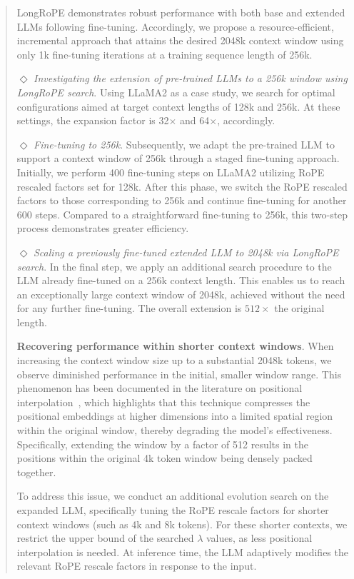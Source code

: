 \begin{abstract}
LongRoPE demonstrates robust performance with both base and extended LLMs following fine-tuning. Accordingly, we propose a resource-efficient, incremental approach that attains the desired 2048k context window using only 1k fine-tuning iterations at a training sequence length of 256k.

$\Diamond$ \textit{Investigating the extension of pre-trained LLMs to a 256k window using LongRoPE search}. Using LLaMA2 as a case study, we search for optimal configurations aimed at target context lengths of 128k and 256k. At these settings, the expansion factor is 32$\times$ and 64$\times$, accordingly.

$\Diamond$ \textit{Fine-tuning to 256k}. Subsequently, we adapt the pre-trained LLM to support a context window of 256k through a staged fine-tuning approach. Initially, we perform 400 fine-tuning steps on LLaMA2 utilizing RoPE rescaled factors set for 128k. After this phase, we switch the RoPE rescaled factors to those corresponding to 256k and continue fine-tuning for another 600 steps. Compared to a straightforward fine-tuning to 256k, this two-step process demonstrates greater efficiency.

$\Diamond$ \textit{Scaling a previously fine-tuned extended LLM to 2048k via LongRoPE search}. In the final step, we apply an additional search procedure to the LLM already fine-tuned on a 256k context length. This enables us to reach an exceptionally large context window of 2048k, achieved without the need for any further fine-tuning. The overall extension is $512\times$ the original length.

\textbf{Recovering performance within shorter context windows}.  When increasing the context window size up to a substantial 2048k tokens, we observe diminished performance in the initial, smaller window range. This phenomenon has been documented in the literature on positional interpolation~\cite{pi}, which highlights that this technique compresses the positional embeddings at higher dimensions into a limited spatial region within the original window, thereby degrading the model's effectiveness. Specifically, extending the window by a factor of 512 results in the positions within the original 4k token window being densely packed together.

To address this issue, we conduct an additional evolution search on the expanded LLM, specifically tuning the RoPE rescale factors for shorter context windows (such as 4k and 8k tokens). For these shorter contexts, we restrict the upper bound of the searched $\lambda$ values, as less positional interpolation is needed. At inference time, the LLM adaptively modifies the relevant RoPE rescale factors in response to the input.


\end{abstract}
